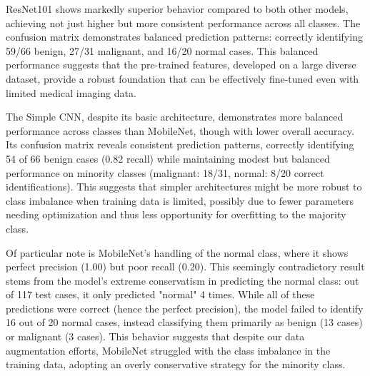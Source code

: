 ResNet101 shows markedly superior behavior compared to both other models, achieving not just higher but more consistent performance across all classes. The confusion matrix demonstrates balanced prediction patterns: correctly identifying 59/66 benign, 27/31 malignant, and 16/20 normal cases. This balanced performance suggests that the pre-trained features, developed on a large diverse dataset, provide a robust foundation that can be effectively fine-tuned even with limited medical imaging data.

The Simple CNN, despite its basic architecture, demonstrates more balanced performance across classes than MobileNet, though with lower overall accuracy. Its confusion matrix reveals consistent prediction patterns, correctly identifying 54 of 66 benign cases (0.82 recall) while maintaining modest but balanced performance on minority classes (malignant: 18/31, normal: 8/20 correct identifications). This suggests that simpler architectures might be more robust to class imbalance when training data is limited, possibly due to fewer parameters needing optimization and thus less opportunity for overfitting to the majority class.

Of particular note is MobileNet's handling of the normal class, where it shows perfect precision (1.00) but poor recall (0.20). This seemingly contradictory result stems from the model's extreme conservatism in predicting the normal class: out of 117 test cases, it only predicted "normal" 4 times. While all of these predictions were correct (hence the perfect precision), the model failed to identify 16 out of 20 normal cases, instead classifying them primarily as benign (13 cases) or malignant (3 cases). This behavior suggests that despite our data augmentation efforts, MobileNet struggled with the class imbalance in the training data, adopting an overly conservative strategy for the minority class.

